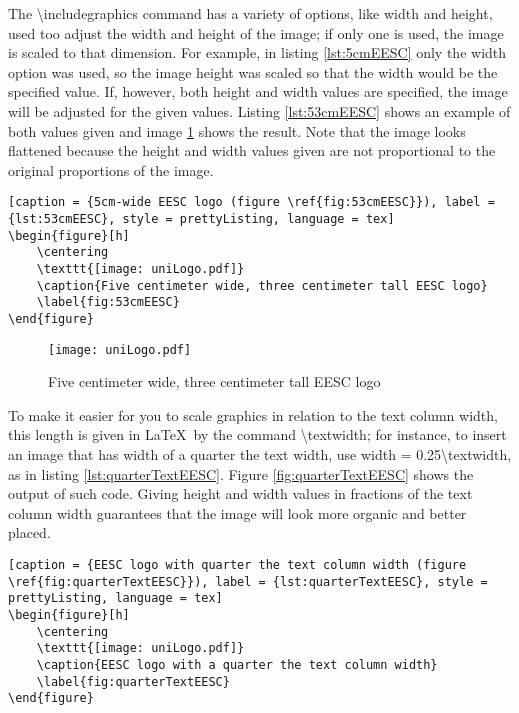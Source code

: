 	The  {\ttfamily\small \textbackslash includegraphics} command has a variety of options, like {\ttfamily\small width} and {\ttfamily\small height}, used too adjust the width and height of the image; if only one is used, the image is scaled to that dimension. For example, in listing \ref{lst:5cmEESC} only the width option was used, so the image height was scaled so that the width would be the specified value. If, however, both height and width values are specified, the image will be adjusted for the given values. Listing \ref{lst:53cmEESC} shows an example of both values given and image \ref{fig:53cmEESC} shows the result. Note that the image looks flattened because the height and width values given are not proportional to the original proportions of the image.

\begin{lstlisting}[caption = {5cm-wide EESC logo (figure \ref{fig:53cmEESC}}), label = {lst:53cmEESC}, style = prettyListing, language = tex]
\begin{figure}[h]
	\centering
	\texttt{[image: uniLogo.pdf]}
	\caption{Five centimeter wide, three centimeter tall EESC logo}
	\label{fig:53cmEESC}
\end{figure}
\end{lstlisting}

\begin{figure}[h]
	\centering
	\texttt{[image: uniLogo.pdf]}
	\caption{Five centimeter wide, three centimeter tall EESC logo}
	\label{fig:53cmEESC}
\end{figure}

	To make it easier for you to scale graphics in relation to the text column width, this length is given in \LaTeX\ by the command {\ttfamily\small \textbackslash textwidth}; for instance, to insert an image that has width of a quarter the text width, use {\ttfamily\small width = 0.25\textbackslash textwidth}, as in listing \ref{lst:quarterTextEESC}. Figure \ref{fig:quarterTextEESC} shows the output of such code. Giving height and width values in fractions of the text column width guarantees that the image will look more organic and better placed.

\begin{lstlisting}[caption = {EESC logo with quarter the text column width (figure \ref{fig:quarterTextEESC}}), label = {lst:quarterTextEESC}, style = prettyListing, language = tex]
\begin{figure}[h]
	\centering
	\texttt{[image: uniLogo.pdf]}
	\caption{EESC logo with a quarter the text column width}
	\label{fig:quarterTextEESC}
\end{figure}
\end{lstlisting}

